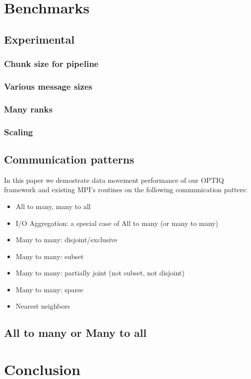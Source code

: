 \documentclass[letter]{article}
\begin{document}
\section{Benchmarks}

\subsection{Experimental }
\subsubsection{Chunk size for pipeline}
\subsubsection{Various message sizes}
\subsubsection{Many ranks}
\subsubsection{Scaling}

\subsection{Communication patterns}
In this paper we demostrate data movement performance of our OPTIQ framework and existing MPI's routines on the following communication patters:

\begin{itemize}
\item All to many, many to all
\item I/O Aggregation: a special case of All to many (or many to many)
\item Many to many: disjoint/exclusive
\item Many to many: subset
\item Many to many: partially joint (not subset, not disjoint)
\item Many to many: sparse
\item Nearest neighbors
\end{itemize}

\subsection{All to many or Many to all}

\section{Conclusion}
\end{document}
